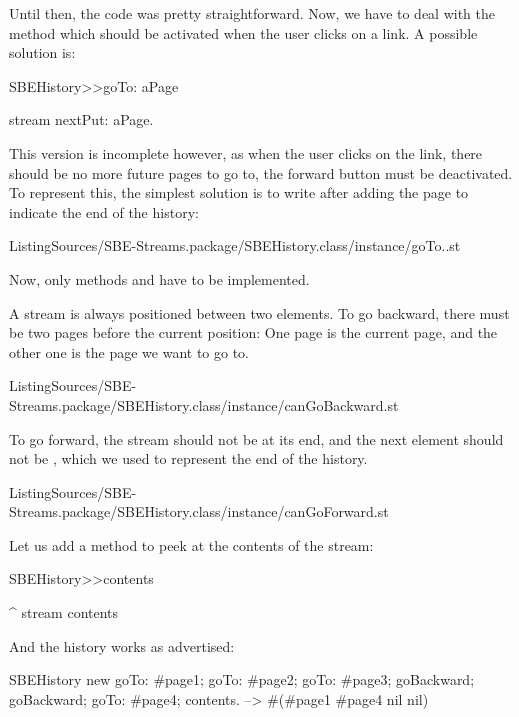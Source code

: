 \documentclass[a4paper,10pt,twoside]{book}
\begin{document}
Until then, the code was pretty straightforward.
Now, we have to deal with the  method which should be activated when the user clicks on a link.
A possible solution is:

\begin{code}{}
SBEHistory>>goTo: aPage

	stream nextPut: aPage.
\end{code}

This version is incomplete however, as when the user clicks on the link, there should be no more future pages to go to, \ie the forward button must be deactivated.
To represent this, the simplest solution is to write  after adding the page to indicate the end of the history:

%
{ListingSources/SBE-Streams.package/SBEHistory.class/instance/goTo..st}

Now, only methods  and  have to be implemented.

A stream is always positioned between two elements.
To go backward, there must be two pages before the current position:
One page is the current page, and the other one is the page we want to go to.

%
{ListingSources/SBE-Streams.package/SBEHistory.class/instance/canGoBackward.st}

To go forward, the stream should not be at its end, and the next element should not be , which we used to represent the end of the history.

%
{ListingSources/SBE-Streams.package/SBEHistory.class/instance/canGoForward.st}

Let us add a method to peek at the contents of the stream:
\begin{code}{}
SBEHistory>>contents

	^ stream contents
\end{code}

And the history works as advertised:
\begin{code}{}
SBEHistory new
	goTo: #page1;
	goTo: #page2;
	goTo: #page3;
	goBackward;
	goBackward;
	goTo: #page4;
	contents. --> #(#page1 #page4 nil nil)
\end{code}
\end{document}
